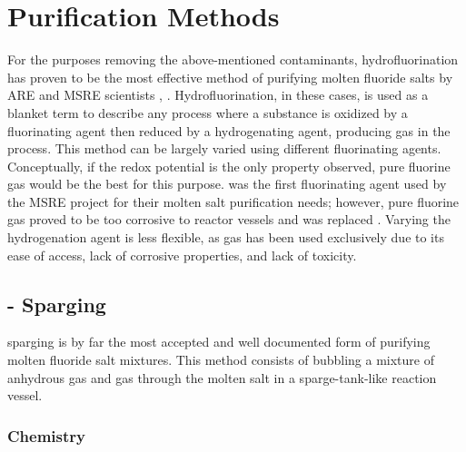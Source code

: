 %
%

\section{Purification Methods}
\label{sec: purification methods}

For the purposes removing the above-mentioned contaminants, hydrofluorination
has proven to be the most effective method of purifying molten fluoride salts
by ARE and MSRE scientists \cite{rev3}, \cite{rev21}. Hydrofluorination, in
these cases, is used as a blanket term to describe any process where a
substance is oxidized by a fluorinating agent then reduced by a hydrogenating
agent, producing  gas in the process. This method can be largely varied
using different fluorinating agents. Conceptually, if the redox potential is
the only property observed, pure fluorine gas would be the best for this
purpose.  was the first fluorinating agent used by the MSRE project for
their molten salt purification needs; however, pure fluorine gas proved to be
too corrosive to reactor vessels and was replaced \cite{rev21}. Varying the
hydrogenation agent is less flexible, as  gas has been used exclusively
due to its ease of access, lack of corrosive properties, and lack of toxicity.
\par

\subsection{- Sparging}
\label{sec: hf sparging}

 sparging is by far the most accepted and well documented form of
purifying molten fluoride salt mixtures. This method consists of bubbling a
mixture of anhydrous  gas and  gas through the molten salt in a
sparge-tank-like reaction vessel. \par

\subsubsection{Chemistry}
\label{sec: hf chemistry}

